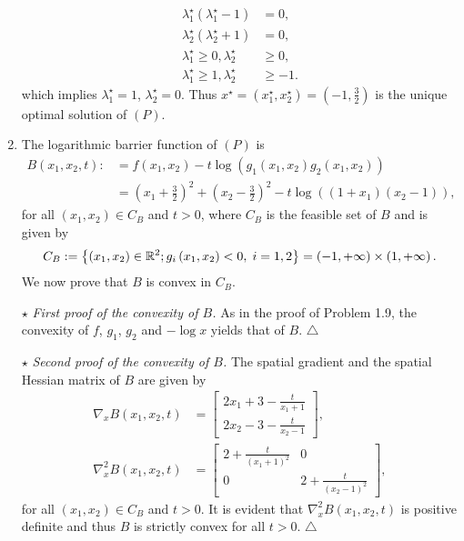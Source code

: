 \documentclass[a4paper]{article}
\numberwithin{equation}{section}
\begin{document}
\begin{enumerate}
\begin{align}
\lambda _1^\star\left( {\lambda _1^\star - 1} \right) &= 0,\\
\lambda _2^\star\left( {\lambda _2^\star + 1} \right) &= 0,\\
\lambda _1^\star \ge 0,\lambda _2^\star &\ge 0,\\
\lambda _1^\star \ge 1,\lambda _2^\star &\ge  - 1.
\end{align}
which implies $\lambda _1^\star = 1$, $\lambda _2^\star = 0$. Thus $x^\star =\left(x_1^\star,x_2^\star\right)=\left(-1,\frac{3}{2}\right)$ is the unique optimal solution of $\left(P\right)$.
\item The logarithmic barrier function of $\left(P\right)$ is 
\begin{align}
B\left( {{x_1},{x_2},t} \right): &= f\left( {{x_1},{x_2}} \right) - t\log \left( {{g_1}\left( {{x_1},{x_2}} \right){g_2}\left( {{x_1},{x_2}} \right)} \right)\\
& = {\left( {{x_1} + \frac{3}{2}} \right)^2} + {\left( {{x_2} - \frac{3}{2}} \right)^2} - t\log \left( {\left( {1 + {x_1}} \right)\left( {{x_2} - 1} \right)} \right),
\end{align}
for all $\left(x_1,x_2\right) \in C_B$ and $t>0$, where $C_B$ is the feasible set of $B$ and is given by
\begin{align}
{C_B}: = \left\{ {\left( {{x_1},{x_2}} \right) \in {\mathbb{R}^2};{g_i}\left( {{x_1},{x_2}} \right) < 0,\hspace{0.1cm} i = 1,2} \right\} = \left( { - 1, + \infty } \right) \times \left( {1, + \infty } \right).
\end{align}
We now prove that $B$ is convex in $C_B$.

$\star$ \textit{First proof of the convexity of $B$.} As in the proof of Problem 1.9, the convexity of $f$, $g_1$, $g_2$ and $-\log x$ yields that of $B$. \hfill $\triangle$

$\star$ \textit{Second proof of the convexity of $B$.} The spatial gradient and the spatial Hessian matrix of $B$ are given by
\begin{align}
\nabla _x B\left( {{x_1},{x_2},t} \right) &= \left[ {\begin{array}{*{20}{c}}
{2{x_1} + 3 - \frac{t}{{{x_1} + 1}}}\\
{2{x_2} - 3 - \frac{t}{{{x_2} - 1}}}
\end{array}} \right],\\
{\nabla _x^2}B\left( {{x_1},{x_2},t} \right)& = \left[ {\begin{array}{*{20}{c}}
{2 + \frac{t}{{{{\left( {{x_1} + 1} \right)}^2}}}}&0\\
0&{2 + \frac{t}{{{{\left( {{x_2} - 1} \right)}^2}}}}
\end{array}} \right],
\end{align}
for all $\left(x_1,x_2\right)\in C_B$ and $t>0$. It is evident that ${\nabla _x^2}B\left( {{x_1},{x_2},t} \right)$ is positive definite and thus $B$ is strictly convex for all $t>0$. \hfill $\triangle$


\end{enumerate}
\end{document}
